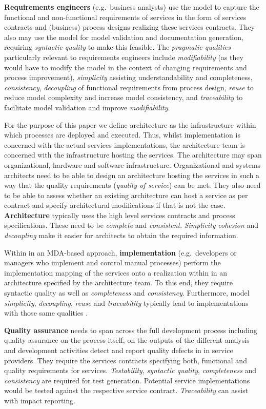 {\bf Requirements engineers} (e.g.\ business analysts) use the model to capture the functional and non-functional requirements of  services in the form of services contracts and (business) process designs realizing these services contracts. They also may use the model for model validation and documentation generation, requiring \emph{syntactic quality} to make this feasible.  The \emph{pragmatic qualities} particularly relevant to requirements engineers include \emph{modifiability} (as they would have to modify the model in the context of changing requirements and process improvement), \emph{simplicity} assisting understandability and completeness, \emph{consistency}, \emph{decoupling} of functional requirements from process design, \emph{reuse} to reduce model complexity and increase model consistency, and \emph{traceability} to facilitate model validation and improve \emph{modifiability}. 

For the purpose of this paper we define architecture as the infrastructure within which processes are deployed and executed. Thus, whilst implementation is concerned with the actual services implementations, the architecture team is concerned with the infrastructure hosting the services. The architecture may span organizational, hardware and software infrastructure. Organizational and systems architects need to be able to design an architecture hosting the services in such a way that the quality requirements (\emph{quality of service}) can be met. They also need to be able to assess whether an existing architecture can host a service as per contract and specify architectural modifications if that is not the case. {\bf Architecture} typically uses the high level services contracts and process specifications. These need to be \emph{complete} and \emph{consistent}. \emph{Simplicity} \emph{cohesion} and \emph{decoupling} make it easier for architects to obtain the required information.

Within in an MDA-based approach, {\bf implementation} (e.g.\ developers or managers who implement and control manual processes) perform the implementation mapping of the services onto a realization within in an architecture specified by the architecture team. To this end, they require syntactic quality as well as \emph{completeness} and \emph{consistency}. Furthermore, model \emph{simplicity}, \emph{decoupling}, \emph{reuse} and \emph{traceability} typically lead to implementations with those same qualities \cite{podgorelec_estimating_2007}.

{\bf Quality assurance} needs to span across the full development process including quality assurance on the process itself, on the outputs of the different analysis and development activities detect and report quality defects in in service providers. They require the services contracts specifying both, functional and quality requirements for services. \emph{Testability}, \emph{syntactic quality}, \emph{completeness} and \emph{consistency} are required for test generation. Potential service implementations would be tested against the respective service contract. \emph{Traceability} can assist with impact reporting.

